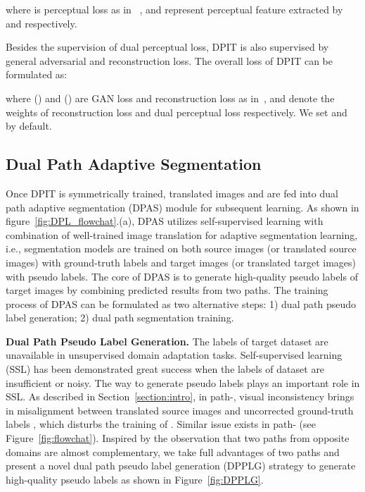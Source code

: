 \documentclass[10pt,twocolumn,letterpaper]{article}
\begin{document}
 where  is perceptual loss as in ~\cite{li2019bidirectional},  and  represent perceptual feature extracted by  and  respectively. 

Besides the supervision of dual perceptual loss, DPIT is also supervised by general adversarial and reconstruction loss. The overall loss of DPIT can be formulated as:

where  () and  () are GAN loss and reconstruction loss as in~\cite{CycleGAN2017},  and  denote the weights of reconstruction loss and dual perceptual loss respectively. We set  and  by default.


\subsection{Dual Path Adaptive Segmentation \label{section:DPSA}} 

 Once DPIT is symmetrically trained, translated images  and  are fed into dual path adaptive segmentation (DPAS) module for subsequent learning. As shown in figure~\ref{fig:DPL_flowchat}.(a), DPAS utilizes self-supervised learning with combination of well-trained image translation for adaptive segmentation learning, i.e., segmentation models are trained on both source images (or translated source images) with ground-truth labels and target images (or translated target images) with pseudo labels. The core of DPAS is to generate high-quality pseudo labels of target images by combining predicted results from two paths. The training process of DPAS can be formulated as two alternative steps: 1) dual path pseudo label generation; 2) dual path segmentation training.

{\noindent \textbf{Dual Path Pseudo Label Generation.}}\hspace{3pt}
The labels of target dataset are unavailable in unsupervised domain adaptation tasks. Self-supervised learning (SSL) has been demonstrated great success when the labels of dataset are insufficient or noisy. The way to generate pseudo labels plays an important role in SSL. As described in Section~\ref{section:intro}, in path-, visual inconsistency brings in misalignment between translated source images  and uncorrected ground-truth labels , which disturbs the training of . Similar issue exists in  path- (see Figure~\ref{fig:flowchat}). Inspired by the observation that two paths from opposite domains are almost complementary, we take full advantages of two paths and present a novel dual path pseudo label generation (DPPLG) strategy to generate high-quality pseudo labels as shown in Figure~\ref{fig:DPPLG}.
\end{document}
